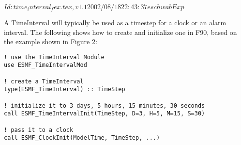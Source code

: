 $Id: time_interval_fex.tex,v 1.1 2002/08/18 22:43:37 eschwab Exp $

A TimeInterval will typically be used as a timestep for a clock or an alarm
interval.  The following shows how to create and initialize one in F90, based
on the example shown in Figure 2:

\begin{verbatim}
! use the TimeInterval Module
use ESMF_TimeIntervalMod

! create a TimeInterval
type(ESMF_TimeInterval) :: TimeStep

! initialize it to 3 days, 5 hours, 15 minutes, 30 seconds
call ESMF_TimeIntervalInit(TimeStep, D=3, H=5, M=15, S=30)

! pass it to a clock
call ESMF_ClockInit(ModelTime, TimeStep, ...)
\end{verbatim}
